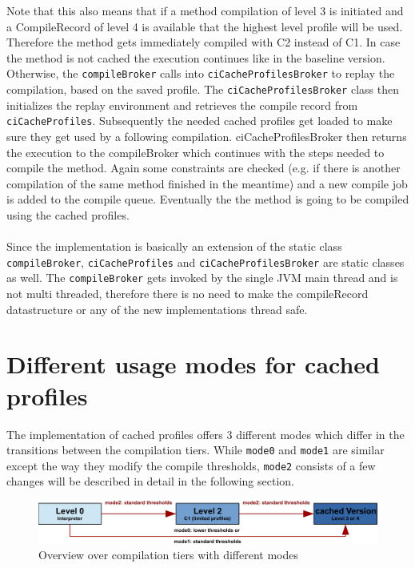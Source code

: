 Note that this also means that if a method compilation of level 3 is initiated and a CompileRecord of level 4 is available that the highest level profile will be used. Therefore the method gets immediately compiled with C2 instead of C1.
In case the method is not cached the execution continues like in the baseline version.
Otherwise, the \texttt{compileBroker} calls into \texttt{ciCacheProfilesBroker} to replay the compilation, based on the saved profile.
The \texttt{ciCacheProfilesBroker} class then initializes the replay environment and retrieves the compile record from \texttt{ciCacheProfiles}. Subsequently the needed cached profiles get loaded to make sure they get used by a following compilation. ciCacheProfilesBroker then returns the execution to the compileBroker which continues with the steps needed to compile the method. Again some constraints are checked (e.g. if there is another compilation of the same method finished in the meantime) and a new compile job is added to the compile queue. Eventually the the method is going to be compiled using the cached profiles.
\\\\
Since the implementation is basically an extension of the static class \texttt{compileBroker}, \texttt{ciCacheProfiles} and \texttt{ciCacheProfilesBroker} are static classes as well. The \texttt{compileBroker} gets invoked by the single JVM main thread and is not multi threaded, therefore there is no need to make the compileRecord datastructure or any of the new implementations thread safe. 

\section{Different usage modes for cached profiles}
The implementation of cached profiles offers 3 different modes which differ in the transitions between the compilation tiers.
While \texttt{mode0} and \texttt{mode1} are similar except the way they modify the compile thresholds, \texttt{mode2} consists of a few changes will be described in detail in the following section.
\begin{figure}[h]
  \begin{center}
    \centering
    \includegraphics{figures/hs_tiers_threshold2.png}
    \caption{Overview over compilation tiers with different modes}
    \label{f:hs_tiers_thresholds}
  \end{center}
\end{figure}

